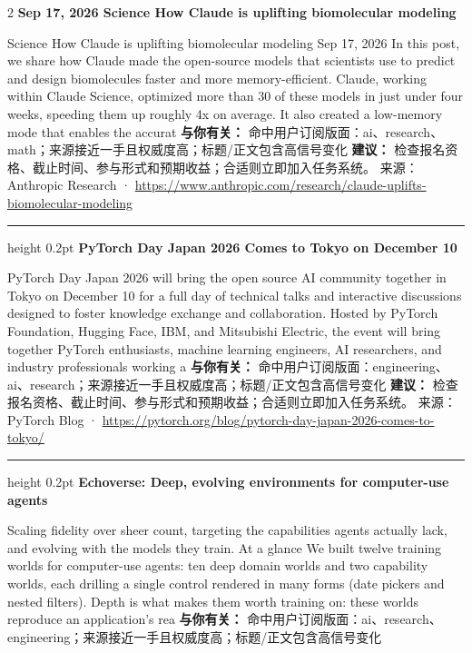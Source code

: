 \documentclass[10.5pt]{ctexart}
\begin{document}
\begin{multicols}{2}
{\large\bfseries Sep 17, 2026 Science How Claude is uplifting biomolecular modeling}\par
Science How Claude is uplifting biomolecular modeling Sep 17, 2026 In this post, we share how Claude made the open-source models that scientists use to predict and design biomolecules faster and more memory-efficient. Claude, working within Claude Science, optimized more than 30 of these models in just under four weeks, speeding them up roughly 4x on average. It also created a low-memory mode that enables the accurat
\textbf{与你有关：} 命中用户订阅版面：ai、research、math；来源接近一手且权威度高；标题/正文包含高信号变化
\textbf{建议：} 检查报名资格、截止时间、参与形式和预期收益；合适则立即加入任务系统。
{\footnotesize\color{ormuted} 来源：Anthropic Research · \url{https://www.anthropic.com/research/claude-uplifts-biomolecular-modeling}}
\vspace{2mm}
\hrule height 0.2pt
\vspace{2mm}
{\large\bfseries PyTorch Day Japan 2026 Comes to Tokyo on December 10}\par
PyTorch Day Japan 2026 will bring the open source AI community together in Tokyo on December 10 for a full day of technical talks and interactive discussions designed to foster knowledge exchange and collaboration. Hosted by PyTorch Foundation, Hugging Face, IBM, and Mitsubishi Electric, the event will bring together PyTorch enthusiasts, machine learning engineers, AI researchers, and industry professionals working a
\textbf{与你有关：} 命中用户订阅版面：engineering、ai、research；来源接近一手且权威度高；标题/正文包含高信号变化
\textbf{建议：} 检查报名资格、截止时间、参与形式和预期收益；合适则立即加入任务系统。
{\footnotesize\color{ormuted} 来源：PyTorch Blog · \url{https://pytorch.org/blog/pytorch-day-japan-2026-comes-to-tokyo/}}
\vspace{2mm}
\hrule height 0.2pt
\vspace{2mm}
{\large\bfseries Echoverse: Deep, evolving environments for computer-use agents}\par
Scaling fidelity over sheer count, targeting the capabilities agents actually lack, and evolving with the models they train. At a glance We built twelve training worlds for computer-use agents: ten deep domain worlds and two capability worlds, each drilling a single control rendered in many forms (date pickers and nested filters). Depth is what makes them worth training on: these worlds reproduce an application’s rea
\textbf{与你有关：} 命中用户订阅版面：ai、research、engineering；来源接近一手且权威度高；标题/正文包含高信号变化

\end{multicols}
\end{document}

